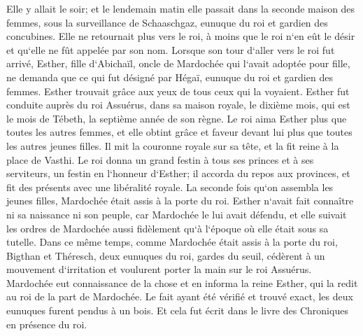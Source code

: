 \verse Elle y allait le soir; et le lendemain matin elle passait dans la seconde maison des femmes, sous la surveillance de Schaaschgaz, eunuque du roi et gardien des concubines. Elle ne retournait plus vers le roi, à moins que le roi n`en eût le désir et qu`elle ne fût appelée par son nom. 
\verse Lorsque son tour d`aller vers le roi fut arrivé, Esther, fille d`Abichaïl, oncle de Mardochée qui l`avait adoptée pour fille, ne demanda que ce qui fut désigné par Hégaï, eunuque du roi et gardien des femmes. Esther trouvait grâce aux yeux de tous ceux qui la voyaient. 
\verse Esther fut conduite auprès du roi Assuérus, dans sa maison royale, le dixième mois, qui est le mois de Tébeth, la septième année de son règne. 
\verse Le roi aima Esther plus que toutes les autres femmes, et elle obtint grâce et faveur devant lui plus que toutes les autres jeunes filles. Il mit la couronne royale sur sa tête, et la fit reine à la place de Vasthi. 
\verse Le roi donna un grand festin à tous ses princes et à ses serviteurs, un festin en l`honneur d`Esther; il accorda du repos aux provinces, et fit des présents avec une libéralité royale. 
\verse La seconde fois qu`on assembla les jeunes filles, Mardochée était assis à la porte du roi. 
\verse Esther n`avait fait connaître ni sa naissance ni son peuple, car Mardochée le lui avait défendu, et elle suivait les ordres de Mardochée aussi fidèlement qu`à l`époque où elle était sous sa tutelle. 
\verse Dans ce même temps, comme Mardochée était assis à la porte du roi, Bigthan et Théresch, deux eunuques du roi, gardes du seuil, cédèrent à un mouvement d`irritation et voulurent porter la main sur le roi Assuérus. 
\verse Mardochée eut connaissance de la chose et en informa la reine Esther, qui la redit au roi de la part de Mardochée. 
\verse Le fait ayant été vérifié et trouvé exact, les deux eunuques furent pendus à un bois. Et cela fut écrit dans le livre des Chroniques en présence du roi. 

